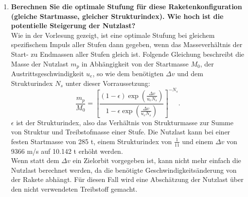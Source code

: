 \documentclass[12pt]{article}
\begin{document}
\begin{enumerate}
    \item \textbf{Berechnen Sie die optimale Stufung für diese Raketenkonfiguration (gleiche Startmasse, gleicher Strukturindex). Wie hoch ist die potentielle Steigerung der Nutzlast?}\\
    
    Wie in der Vorlesung gezeigt, ist eine optimale Stufung bei gleichem spezifischem Impuls aller Stufen dann gegeben, wenn das Masseverhältnis der Start- zu Endmassen aller Stufen gleich ist. Folgende Gleichung beschreibt die Masse der Nutzlast $m_{p}$ in Abhängigkeit von der Startmasse $M_0$, der Austrittsgeschwindigkeit $u_e$, so wie dem benötigten $\Delta v$ und dem Strukturindex $N_s$ unter dieser Vorraussetzung:
    \begin{equation}
        \frac{m_p}{M_0} = \left[ \frac{(1-\epsilon) \exp{\left( \frac{\Delta v}{u_e N_s}\right) }}{1-\epsilon \exp{ \left(\frac{\Delta v}{u_e N_s}\right)}} \right]^{-N_s}.
    \end{equation}
    $\epsilon$ ist der Strukturindex, also das Verhältnis von Strukturmasse zur Summe von Struktur und Treibstofmasse einer Stufe. Die Nutzlast kann bei einer festen Startmasse von 285 t, einem Strukturindex von $\frac{1}{11}$ und einem $\Delta v$ von 9366 m/s auf 10.142 t erhöht werden. \\

    Wenn statt dem $\Delta v$ ein Zielorbit vorgegeben ist, kann nicht mehr einfach die Nutzlast berechnet werden, da die benötigte Geschwindigkeitsänderung von der Rakete abhängt. Für diesen Fall wird eine Abschätzung der Nutzlast über den nicht verwendeten Treibstoff gemacht.


\end{enumerate}
\end{document}
